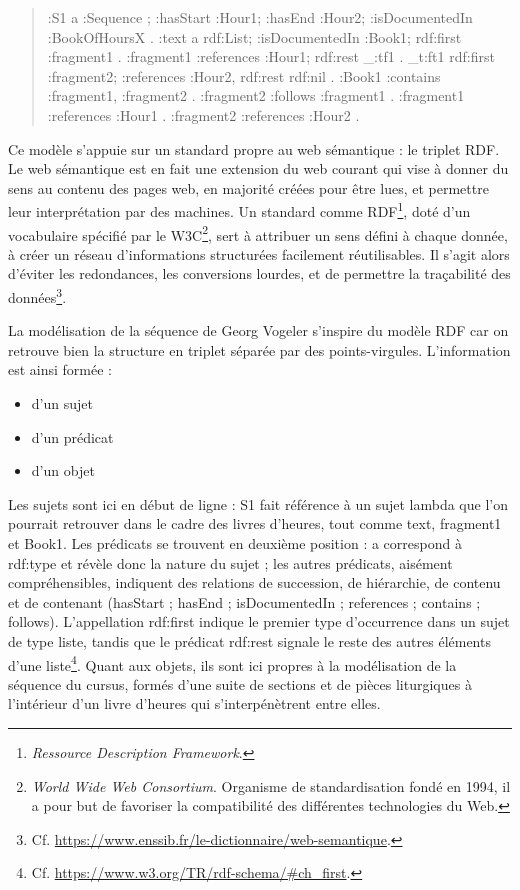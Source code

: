 \documentclass[a4paper,12pt,twoside]{book}
\begin{document}
	\begin{quote}
:S1 a :Sequence ; :hasStart :Hour1; :hasEnd :Hour2; :isDocumentedIn :BookOfHoursX .
:text a rdf:List; :isDocumentedIn :Book1; rdf:first :fragment1 .
:fragment1 :references :Hour1; rdf:rest _:tf1 . _t:ft1 rdf:first :fragment2; :references :Hour2, rdf:rest rdf:nil .
:Book1 :contains :fragment1, :fragment2 . :fragment2 :follows :fragment1 . :fragment1 :references :Hour1 . :fragment2 :references :Hour2 .
	\end{quote}
	
	Ce modèle s'appuie sur un standard propre au web sémantique : le triplet RDF. Le web sémantique est en fait une extension du web courant qui vise à donner du sens au contenu des pages web, en majorité créées pour être lues, et permettre leur interprétation par des machines. Un standard comme RDF\footnote{\textit{Ressource Description Framework}.}, doté d'un vocabulaire spécifié par le W3C\footnote{\textit{World Wide Web Consortium}. Organisme de standardisation fondé en 1994, il a pour but de favoriser la compatibilité des différentes technologies du Web.}, sert à attribuer un sens défini à chaque donnée, à créer un réseau d'informations structurées facilement réutilisables. Il s'agit alors d'éviter les redondances, les conversions lourdes, et de permettre la traçabilité des données\footnote{Cf. \url{https://www.enssib.fr/le-dictionnaire/web-semantique}.}. 
	
	La modélisation de la séquence de Georg Vogeler s'inspire du modèle RDF car on retrouve bien la structure en triplet séparée par des points-virgules. L'information est ainsi formée :
	\begin{itemize}
	    \item d'un sujet
	    \item d'un prédicat
	    \item d'un objet
	\end{itemize}
	Les sujets sont ici en début de ligne : \og S1\fg{} fait référence à un sujet lambda que l'on pourrait retrouver dans le cadre des livres d'heures, tout comme \og text\fg{}, \og fragment1\fg{} et \og Book1\fg{}. Les prédicats se trouvent en deuxième position : \og a\fg{} correspond à \og rdf:type\fg{} et révèle donc la nature du sujet ; les autres prédicats, aisément compréhensibles, indiquent des relations de succession, de hiérarchie, de contenu et de contenant (\og hasStart\fg{} ; \og hasEnd\fg{} ; \og isDocumentedIn\fg{} ; \og references\fg{} ; \og contains\fg{} ; \og follows\fg{}). L'appellation \og rdf:first\fg{} indique le premier type d'occurrence dans un sujet de type liste, tandis que le prédicat \og rdf:rest\fg{} signale le reste des autres éléments d'une liste\footnote{Cf. \url{https://www.w3.org/TR/rdf-schema/#ch_first}.}. Quant aux objets, ils sont ici propres à la modélisation de la séquence du cursus, formés d'une suite de sections et de pièces liturgiques à l'intérieur d'un livre d'heures qui s'interpénètrent entre elles. 
	
\end{document}

